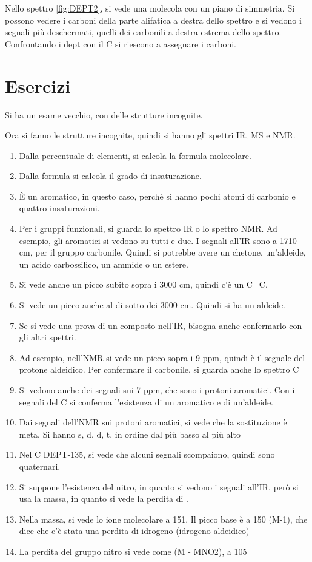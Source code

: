 
Nello spettro \ref{fig:DEPT2}, si vede una molecola con un piano di simmetria.
Si possono vedere i carboni della parte alifatica a destra dello spettro e si
vedono i segnali più deschermati, quelli dei carbonili a destra estrema dello spettro.
Confrontando i dept con il C si riescono a assegnare i carboni.

\section{Esercizi}

Si ha un esame vecchio, con delle strutture incognite.

Ora si fanno le strutture incognite, quindi si hanno gli spettri IR, MS
e NMR.

\begin{enumerate}
\item
  Dalla percentuale di elementi, si calcola la formula molecolare.
\item
  Dalla formula si calcola il grado di insaturazione.
\item
  È un aromatico, in questo caso, perché si hanno pochi atomi di
  carbonio e quattro insaturazioni.
\item
  Per i gruppi funzionali, si guarda lo spettro IR o lo spettro NMR. Ad
  esempio, gli aromatici si vedono su tutti e due. I segnali all'IR sono
  a 1710 cm, per il gruppo carbonile. Quindi si potrebbe avere un
  chetone, un'aldeide, un acido carbossilico, un ammide o un estere.
\item
  Si vede anche un picco subito sopra i 3000 cm, quindi c'è un C=C.
\item
  Si vede un picco anche al di sotto dei 3000 cm. Quindi si ha un aldeide.
\item
  Se si vede una prova di un composto nell'IR, bisogna anche confermarlo con gli altri spettri.
\item
  Ad esempio, nell'NMR si vede un picco sopra i 9 ppm, quindi è il segnale del protone aldeidico. Per confermare il carbonile, si guarda anche lo spettro C
\item
  Si vedono anche dei segnali sui 7 ppm, che sono i protoni aromatici. Con i segnali del C si conferma l'esistenza di un aromatico e di   un'aldeide.
\item
  Dai segnali dell'NMR sui protoni aromatici, si vede che la sostituzione è meta. Si hanno s, d, d, t, in ordine dal più basso al più alto
\item
  Nel C DEPT-135, si vede che alcuni segnali scompaiono, quindi sono quaternari.
\item
  Si suppone l'esistenza del nitro, in quanto si vedono i segnali all'IR, però si usa la massa, in quanto si vede la perdita di .
\item
  Nella massa, si vede lo ione molecolare a 151. Il picco base è a 150 (M-1), che dice che c'è stata una perdita di idrogeno (idrogeno aldeidico)
\item
  La perdita del gruppo nitro si vede come (M - MNO2), a 105
\end{enumerate}

